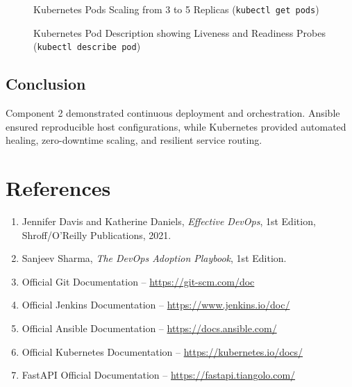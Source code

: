 \documentclass[12pt,a4paper]{article}
\begin{document}
\begin{figure}[htbp]
\centering
\caption{Kubernetes Pods Scaling from 3 to 5 Replicas (\texttt{kubectl get pods})}
\end{figure}

\begin{figure}[htbp]
\centering
\caption{Kubernetes Pod Description showing Liveness and Readiness Probes (\texttt{kubectl describe pod})}
\end{figure}

\subsection*{Conclusion}
Component 2 demonstrated continuous deployment and orchestration. Ansible ensured reproducible host configurations, while Kubernetes provided automated healing, zero-downtime scaling, and resilient service routing.

\newpage

\section*{References}

\begin{enumerate}[nosep]
    \item Jennifer Davis and Katherine Daniels, \textit{Effective DevOps}, 1st Edition, Shroff/O'Reilly Publications, 2021.
    \item Sanjeev Sharma, \textit{The DevOps Adoption Playbook}, 1st Edition.
    \item Official Git Documentation -- \url{https://git-scm.com/doc}
    \item Official Jenkins Documentation -- \url{https://www.jenkins.io/doc/}
    \item Official Ansible Documentation -- \url{https://docs.ansible.com/}
    \item Official Kubernetes Documentation -- \url{https://kubernetes.io/docs/}
    \item FastAPI Official Documentation -- \url{https://fastapi.tiangolo.com/}
\end{enumerate}
\end{document}
